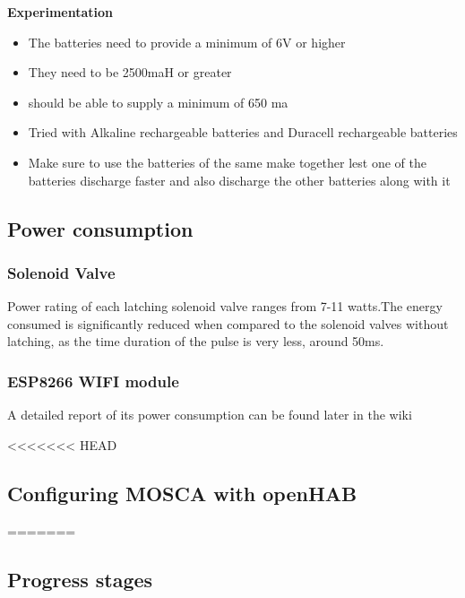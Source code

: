 \documentclass[16pt]{article}
\begin{document}
\hfill

{\Large{\textbf{Experimentation}}}

\begin{itemize}

\item
  The batteries need to provide a minimum of 6V or higher
\item
  They need to be 2500maH or greater
\item
  should be able to supply a minimum of 650 ma
\item
  Tried with Alkaline rechargeable batteries and Duracell rechargeable
  batteries
\item
  Make sure to use the batteries of the same make together lest one of
  the batteries discharge faster and also discharge the other batteries
  along with it
\end{itemize}

\hfill

\subsection{Power consumption}



 
\subsubsection{Solenoid Valve}

Power rating of each latching solenoid valve
ranges from 7-11 watts.The energy consumed is significantly reduced when
compared to the solenoid valves without latching, as the time duration
of the pulse is very less, around 50ms.

\subsubsection{ESP8266 WIFI module}

A detailed report of its power consumption can be found later in the
wiki



<<<<<<< HEAD
\subsection{Configuring MOSCA with
openHAB}

=======
\subsection{Progress stages}
\end{document}
